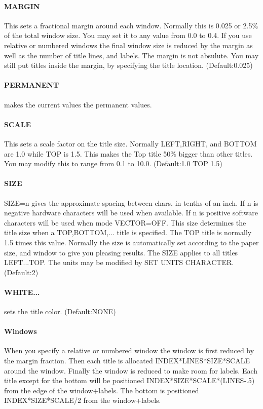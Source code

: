 \paragraph{MARGIN}
This  sets  a fractional margin around each window.  Normally this is
0.025 or 2.5\% of the total window size.  You may set it to any  value
from  0.0  to 0.4.  If you use relative or numbered windows the final
window size is reduced by the margin as well as the number  of  title
lines,  and  labels.   The margin is not absulute.  You may still put
titles  inside  the  margin,  by  specifying  the   title   location.
(Default:0.025) 
\paragraph{PERMANENT}
makes the current values the permanent values.  
\paragraph{SCALE}
This sets a scale factor on the title size.  Normally LEFT,RIGHT, and
BOTTOM are 1.0 while TOP is 1.5.  This makes the Top title 50\% bigger
than  other  titles.   You may modify this to range from 0.1 to 10.0.
(Default:1.0 TOP 1.5) 
\paragraph{SIZE}
SIZE=n  gives the approximate spacing between chars.  in tenths of an
inch.  If n  is  negative  hardware  characters  will  be  used  when
available.   If  n  is positive software characters will be used when
mode  VECTOR=OFF.   This  size  determines  the  title  size  when  a
TOP,BOTTOM,...   title  is  specified.  The TOP title is normally 1.5
times this value.  Normally the size is automatically  set  according
to the paper size, and window to give you pleasing results.  The SIZE
applies to all titles LEFT...TOP.   The  units  may  be  modified  by
SET UNITS CHARACTER.  
(Default:2) 
\paragraph{WHITE...}
sets the title color.  (Default:NONE) 
\paragraph{Windows}
When  you  specify  a relative or numbered window the window is first
reduced by  the  margin  fraction.   Then  each  title  is  allocated
INDEX*LINES*SIZE*SCALE  around  the  window.   Finally  the window is
reduced to make room for labels.  Each title except  for  the  bottom
will  be  positioned INDEX*SIZE*SCALE*(LINES-.5) from the edge of the
window+labels.  The bottom is positioned INDEX*SIZE*SCALE/2 from  the
window+labels.  
